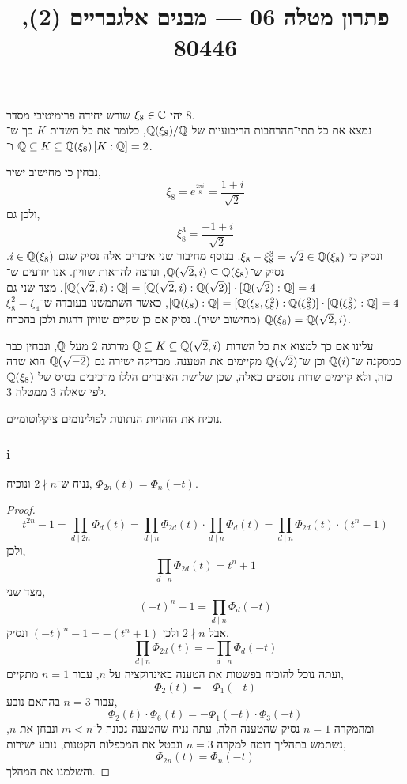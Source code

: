 
\title{פתרון מטלה 06 --- מבנים אלגבריים (2), 80446}


\maketitle
\maketitleprint[red]

\question{}
יהי $\xi_8 \in \mathbb{C}$ שורש יחידה פרימיטיבי מסדר $8$. \\
נמצא את כל תתי־ההרחבות הריבועיות של $\mathbb{Q}(\xi_8) / \mathbb{Q}$,
כלומר את כל השדות $K$ כך ש־$\mathbb{Q} \subseteq K \subseteq \mathbb{Q}(\xi_8)$ ו־$[K : \mathbb{Q} ] = 2$.
\begin{solution}
	נבחין כי מחישוב ישיר,
	\[
		\xi_8
		= e^{\frac{2\pi i}{8}}
		= \frac{1 + i}{\sqrt{2}}
	\]
	ולכן גם,
	\[
		\xi_8^3
		= \frac{-1 + i}{\sqrt{2}}
	\]
	ונסיק כי $\xi_8 - \xi_8^3 = \sqrt{2} \in \mathbb{Q}(\xi_8)$.
	בנוסף מחיבור שני איברים אלה נסיק שגם $i \in \mathbb{Q}(\xi_8)$.
	נסיק ש־$\mathbb{Q}(\sqrt{2}, i) \subseteq \mathbb{Q}(\xi_8)$, ונרצה להראות שוויון.
	אנו יודעים ש־$[\mathbb{Q}(\sqrt{2}, i) : \mathbb{Q}] = [\mathbb{Q}(\sqrt{2}, i) : \mathbb{Q}(\sqrt{2})] \cdot [\mathbb{Q}(\sqrt{2}) : \mathbb{Q}] = 4$.
	מצד שני גם $[\mathbb{Q}(\xi_8) : \mathbb{Q}] = [\mathbb{Q}(\xi_8, \xi_8^2) : \mathbb{Q}(\xi_8^2)] \cdot [\mathbb{Q}(\xi_8^2) : \mathbb{Q}] = 4$, כאשר השתמשנו בעובדה ש־$\xi_8^2 = \xi_4$ (מחישוב ישיר).
	נסיק אם כן שקיים שוויון דרגות ולכן בהכרח $\mathbb{Q}(\xi_8) = \mathbb{Q}(\sqrt{2}, i)$.

	עלינו אם כך למצוא את כל השדות $\mathbb{Q} \subseteq K \subseteq \mathbb{Q}(\sqrt{2}, i)$ מדרגה $2$ מעל $\mathbb{Q}$, ונבחין כבר כמסקנה ש־$\mathbb{Q}(i)$ וכן ש־$\mathbb{Q}(\sqrt{2})$ מקיימים את הטענה.
	מבדיקה ישירה גם $\mathbb{Q}(\sqrt{-2})$ הוא שדה כזה, ולא קיימים שדות נוספים כאלה, שכן שלושת האיברים הללו מרכיבים בסיס של $\mathbb{Q}(\xi_8)$ לפי שאלה 3 ממטלה 3.
\end{solution}

\question{}
\subquestion{}
נוכיח את הזהויות הנתונות לפולינומים ציקלוטומיים.

\subsubsection{i}
נניח ש־$2 \nmid n$ ונוכיח,
$\Phi_{2n}(t) = \Phi_n(-t)$.
\begin{proof}
	\[
		t^{2n} - 1
		= \prod_{d \mid 2n} \Phi_d(t)
		= \prod_{d \mid n} \Phi_{2d}(t) \cdot \prod_{d \mid n} \Phi_d(t)
		= \prod_{d \mid n} \Phi_{2d}(t) \cdot (t^n - 1)
	\]
	ולכן,
	\[
		\prod_{d \mid n} \Phi_{2d}(t) = t^n + 1
	\]
	מצד שני,
	\[
		{(-t)}^n - 1
		= \prod_{d \mid n} \Phi_d(-t)
	\]
	אבל $2 \nmid n$ ולכן ${(-t)}^n - 1 = -(t^n + 1)$ ונסיק,
	\[
		\prod_{d \mid n} \Phi_{2d}(t)
		= - \prod_{d \mid n} \Phi_d(-t)
	\]
	ועתה נוכל להוכיח בפשטות את הטענה באינדוקציה על $n$, עבור $n = 1$ מתקיים,
	\[
		\Phi_2(t) = - \Phi_1(-t)
	\]
	עבור $n = 3$ בהתאם נובע,
	\[
		\Phi_{2}(t) \cdot \Phi_6(t)
		= - \Phi_1(-t) \cdot \Phi_3(-t)
	\]
	ומהמקרה $n = 1$ נסיק שהטענה חלה, עתה נניח שהטענה נכונה ל־$m < n$ ונבחן את $n$, נשתמש בתהליך דומה למקרה $n = 3$ ונבטל את המכפלות הקטנות, נובע ישירות,
	\[
		\Phi_{2n}(t)
		= \Phi_n(-t)
	\]
	והשלמנו את המהלך.
\end{proof}

